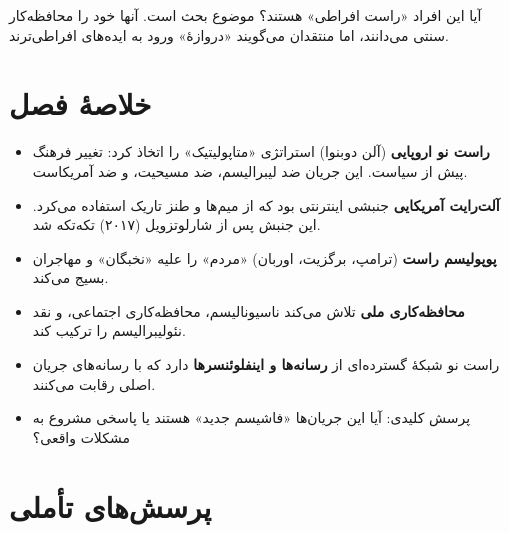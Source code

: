 آیا این افراد «راست افراطی» هستند؟ موضوع بحث است. آنها خود را محافظه‌کار سنتی می‌دانند، اما منتقدان می‌گویند «دروازهٔ» ورود به ایده‌های افراطی‌ترند.


\section*{خلاصهٔ فصل}

\begin{tcolorbox}[
    enhanced,
    colback=lightbg,
    colframe=darkgray,
    boxrule=2pt,
    arc=8pt,
    fonttitle=\bfseries\large,
    title={\rl{📝 خلاصهٔ فصل سیزدهم}}
]
\begin{itemize}
    \item \textbf{راست نو اروپایی} (آلن دوبنوا) استراتژی «متاپولیتیک» را اتخاذ کرد: تغییر فرهنگ پیش از سیاست. این جریان ضد لیبرالیسم، ضد مسیحیت، و ضد آمریکاست.
    
    \item \textbf{آلت‌رایت آمریکایی} جنبشی اینترنتی بود که از میم‌ها و طنز تاریک استفاده می‌کرد. این جنبش پس از شارلوتزویل (۲۰۱۷) تکه‌تکه شد.
    
    \item \textbf{پوپولیسم راست} (ترامپ، برگزیت، اوربان) «مردم» را علیه «نخبگان» و مهاجران بسیج می‌کند.
    
    \item \textbf{محافظه‌کاری ملی} تلاش می‌کند ناسیونالیسم، محافظه‌کاری اجتماعی، و نقد نئولیبرالیسم را ترکیب کند.
    
    \item راست نو شبکهٔ گسترده‌ای از \textbf{رسانه‌ها و اینفلوئنسرها} دارد که با رسانه‌های جریان اصلی رقابت می‌کنند.
    
    \item پرسش کلیدی: آیا این جریان‌ها «فاشیسم جدید» هستند یا پاسخی مشروع به مشکلات واقعی؟
\end{itemize}
\end{tcolorbox}

\section*{پرسش‌های تأملی}

